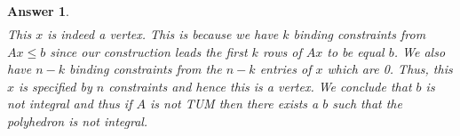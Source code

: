 \documentclass[12pt]{article}
\theoremstyle{colon}
\newtheorem*{answer}{Answer}
\begin{document}
\begin{answer}
\begin{gather*}
  \end{gather*}
  This $x$ is indeed a vertex. This is because we have $k$ binding constraints from $Ax \leq b$ since our construction leads the first $k$ rows of $Ax$ to be equal $b$. We also have $n-k$ binding constraints from the $n-k$ entries of $x$ which are 0. Thus, this $x$ is specified by $n$ constraints and hence this is a vertex. We conclude that $b$ is not integral and thus if $A$ is not TUM then there exists a $b$ such that the polyhedron is not integral.
\end{answer}
\end{document}
